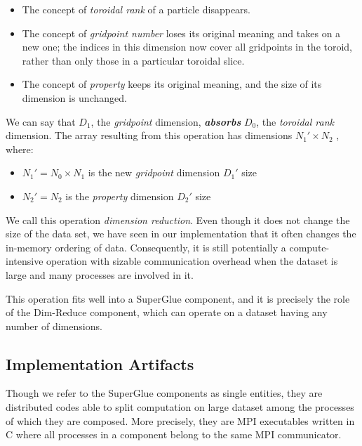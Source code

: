 \begin{itemize}

\item The concept of {\em toroidal rank} of a particle disappears.

\item The concept of {\em gridpoint number} loses its
  original meaning and takes
  on a new one; the indices in this dimension now
  cover all gridpoints in the toroid,
  rather than only those in a particular toroidal slice.
  
\item The concept of {\em property} keeps its original
  meaning, and the size of its dimension is unchanged.

\end{itemize}

We can say that $D_1$, the {\em gridpoint} dimension,
\textbf{\em absorbs} $D_0$, the {\em toroidal rank} dimension.
The array resulting from this
operation has dimensions $N_1'{\times}N_2$ , where:

\begin{itemize}

\item $N_1' = N_0{\times}N_1$ is the new {\em gridpoint} dimension $D_1'$ size

\item $N_2' = N_2$ is the {\em property} dimension $D_2'$ size

\end{itemize}

We call this operation {\em dimension reduction}.
Even though it does not
change the size of the data set, we have seen in our implementation 
that it often changes the in-memory
ordering of data. Consequently, it is still potentially a
compute-intensive operation with sizable communication overhead
when the dataset is large and many
processes are involved in it.

This operation fits well into a
SuperGlue component, and it is precisely
the role of the Dim-Reduce
component, which can operate on a dataset having
any number of dimensions.

\subsection{Implementation Artifacts}

Though we refer to the SuperGlue components as single entities,
they are distributed
codes able to split computation on large dataset
among the processes of which they are
composed. More precisely, they are MPI executables written in C
where all processes in a component belong to the
same MPI communicator.


